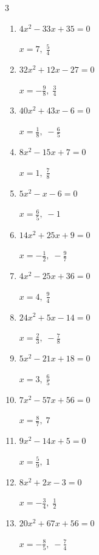 \begin{multicols}{3}
\begin{enumerate}
        $\displaystyle x=-1,\; -\frac{1}{8}$

  \item $4x^{2}-33x+35=0$

        $\displaystyle x=7,\; \frac{5}{4}$

  \item $32x^{2}+12x-27=0$

        $\displaystyle x=-\frac{9}{8},\; \frac{3}{4}$

  \item $40x^{2}+43x-6=0$

        $\displaystyle x=\frac{1}{8},\; -\frac{6}{5}$

  \item $8x^{2}-15x+7=0$

        $\displaystyle x=1,\; \frac{7}{8}$

  \item $5x^{2}-x-6=0$

        $\displaystyle x=\frac{6}{5},\; -1$

\columnbreak %

  \item $14x^{2}+25x+9=0$

        $\displaystyle x=-\frac{1}{2},\; -\frac{9}{7}$

  \item $4x^{2}-25x+36=0$

        $\displaystyle x=4,\; \frac{9}{4}$

  \item $24x^{2}+5x-14=0$

        $\displaystyle x=\frac{2}{3},\; -\frac{7}{8}$

  \item $5x^{2}-21x+18=0$

        $\displaystyle x=3,\; \frac{6}{5}$

  \item $7x^{2}-57x+56=0$

        $\displaystyle x=\frac{8}{7},\; 7$

  \item $9x^{2}-14x+5=0$

        $\displaystyle x=\frac{5}{9},\; 1$

  \item $8x^{2}+2x-3=0$

        $\displaystyle x=-\frac{3}{4},\; \frac{1}{2}$

  \item $20x^{2}+67x+56=0$

        $\displaystyle x=-\frac{8}{5},\; -\frac{7}{4}$


\end{enumerate}
\end{multicols}
